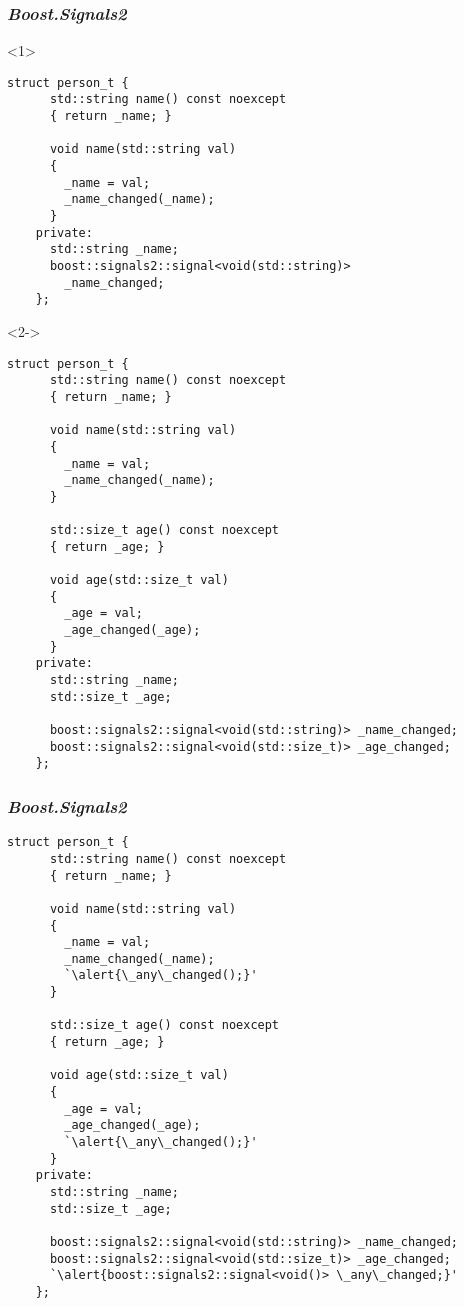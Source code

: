 \documentclass[t]{beamer}
\begin{document}
\begin{frame}[fragile]
  \frametitle{\textit{Boost.Signals2}}

  \begin{onlyenv}<1>
  \begin{lstlisting}[escapeinside=`']
    struct person_t {
      std::string name() const noexcept
      { return _name; }
      
      void name(std::string val)
      {
        _name = val;
        _name_changed(_name);
      }
    private:    
      std::string _name;
      boost::signals2::signal<void(std::string)>
        _name_changed;
    };
  \end{lstlisting}
  \end{onlyenv}

  \begin{onlyenv}<2->
  \begin{lstlisting}[basicstyle=\fontsize{8}{8}\selectfont]
    struct person_t {
      std::string name() const noexcept
      { return _name; }
      
      void name(std::string val)
      {
        _name = val;
        _name_changed(_name);
      }

      std::size_t age() const noexcept
      { return _age; }
      
      void age(std::size_t val)
      {
        _age = val;
        _age_changed(_age);
      }
    private:    
      std::string _name;
      std::size_t _age;

      boost::signals2::signal<void(std::string)> _name_changed;
      boost::signals2::signal<void(std::size_t)> _age_changed;
    };
  \end{lstlisting}
  \end{onlyenv}
\end{frame}

\begin{frame}[fragile]
  \frametitle{\textit{Boost.Signals2}}

  \begin{lstlisting}[basicstyle=\fontsize{7}{7}\selectfont,escapeinside=`']
    struct person_t {
      std::string name() const noexcept
      { return _name; }
      
      void name(std::string val)
      {
        _name = val;
        _name_changed(_name);
        `\alert{\_any\_changed();}' 
      }

      std::size_t age() const noexcept
      { return _age; }
      
      void age(std::size_t val)
      {
        _age = val;
        _age_changed(_age);
        `\alert{\_any\_changed();}' 
      }
    private:    
      std::string _name;
      std::size_t _age;

      boost::signals2::signal<void(std::string)> _name_changed;
      boost::signals2::signal<void(std::size_t)> _age_changed;
      `\alert{boost::signals2::signal<void()> \_any\_changed;}'
    };
  \end{lstlisting}
\end{frame}
\end{document}
